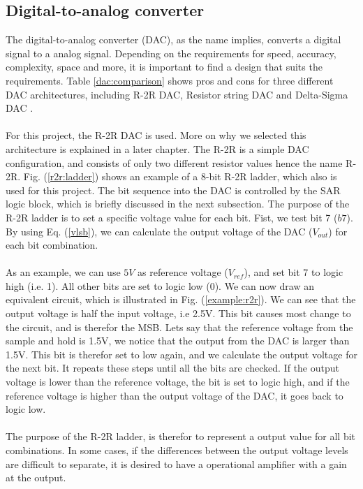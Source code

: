 \documentclass[english, 12pt, a4paper]{ifimaster}
\begin{document}
\subsection{Digital-to-analog converter}
The digital-to-analog converter (DAC), as the name implies, converts a digital signal to a analog signal. Depending on the requirements for speed, accuracy, complexity, space and more, it is 
important to find a design that suits the requirements. Table \ref{dac:comparison} shows pros and cons for three different DAC architectures, including R-2R DAC, Resistor string DAC and 
Delta-Sigma DAC \cite{different-dac}. \\
\\
For this project, the R-2R DAC is used. More on why we selected this architecture is explained in a later chapter. The R-2R is a simple DAC configuration, and consists of only two different 
resistor values hence the name R-2R. Fig. (\ref{r2r:ladder}) shows an example of a 8-bit R-2R ladder, which also is used for this project. The bit sequence into the DAC is controlled by the SAR logic
block, which is briefly discussed in the next subsection. The purpose of the R-2R ladder is to set a specific voltage value for each bit. Fist, we test bit 7 (\(b7\)). By using Eq. (\ref{vlsb}), we 
can calculate the output voltage of the DAC (\(V_{out}\)) for each bit combination.\\
\\
As an example, we can use \(5V\) as reference voltage (\(V_{ref}\)), and set bit 7 to logic high (i.e. 1). All other bits are set to logic low (0). We can now draw an equivalent circuit, 
which is illustrated in Fig. (\ref{example:r2r}). We can see that the output voltage is half the input voltage, i.e 2.5V. 
This bit causes most change to the circuit, and is therefor the MSB. Lets say that the reference voltage from the sample and hold is 1.5V, we notice that the output from the DAC is larger than 1.5V.
This bit is therefor set to low again, and we calculate the output voltage for the next bit. It repeats these steps until all the bits are checked. If the output voltage is lower than the reference 
voltage, the bit is set to logic high, and if the reference voltage is higher than the output voltage of the DAC, it goes back to logic low.\\
\\
The purpose of the R-2R ladder, is therefor to represent a output value for all bit combinations. In some cases, if the differences between the output voltage levels are difficult to separate, 
it is desired to have a operational amplifier with a gain at the output. 
\end{document}
